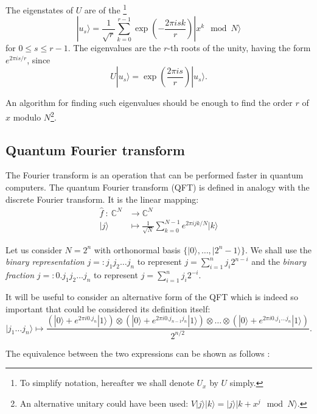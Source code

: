 \documentclass[a4paper, 10pt]{article}
\numberwithin{equation}{section}
\numberwithin{figure}{section}
\numberwithin{table}{section}
\begin{document}
The eigenstates of $U$ are of the \footnote{To simplify notation, hereafter we shall denote $U_x$ by $U$ simply.}
\begin{equation}
	|u_s\rangle = \frac{1}{\sqrt{r}} \sum_{k=0}^{r-1}\exp{\left(-\frac{2\pi i sk}{r}\right)}|x^k \mod N \rangle
\end{equation}
for $0 \le s \le r-1$. The eigenvalues are the $r$-th roots of the unity, having the form $e^{2\pi is/r}$, since
\begin{equation}
	U|u_s\rangle = \exp\left(\frac{2\pi is}{r}\right)|u_s\rangle.
\end{equation}

An algorithm for finding such eigenvalues should be enough to find the order $r$ of $x$ modulo $N$\footnote{An alternative unitary could have been used: $V|j\rangle|k\rangle=|j\rangle|k+x^j\mod N\rangle$.}.

\subsection{Quantum Fourier transform}

The Fourier transform is an operation that can be performed faster in quantum computers. The quantum Fourier transform (QFT) \cite{griffighs} is defined in analogy with the discrete Fourier transform. It is the linear mapping:
\begin{align}
	\hat{f}\ :\ \mathbb{C}^N &\rightarrow \mathbb{C}^N \nonumber \\
	|j\rangle &\mapsto \frac{1}{\sqrt{N}}\sum_{k=0}^{N-1}e^{2\pi ijk/N}|k\rangle
\end{align}

Let us consider $N=2^n$ with orthonormal basis $\{|0\rangle,\dots,|2^n-1\rangle\}$. We shall use the \textit{binary representation} $j =: j_1j_2\dots j_n$ to represent $j = \sum_{i=1}^{n}j_{i}2^{n-i}$ and the \textit{binary fraction} $j =: 0.j_1j_2\dots j_n$ to represent $j = \sum_{i=1}^{n}j_{i}2^{-i}$.

It will be useful to consider an alternative form of the QFT which is indeed so important that could be considered its definition itself:
\begin{equation}
	|j_1\dots j_n\rangle \mapsto \frac{\left(|0\rangle+e^{2\pi i0.j_n}|1\rangle\right)\otimes\left(|0\rangle+e^{2\pi i0.j_{n-1}j_n}|1\rangle\right)\otimes\dots\otimes\left(|0\rangle+e^{2\pi i0.j_1\dots j_n}|1\rangle\right)}{2^{n/2}}.
\end{equation}

The equivalence between the two expressions can be shown as follows \cite{nielsen}:
\end{document}
